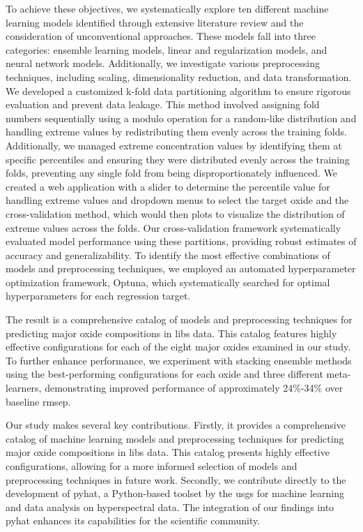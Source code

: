 To achieve these objectives, we systematically explore ten different machine learning models identified through extensive literature review and the consideration of unconventional approaches.
These models fall into three categories: ensemble learning models, linear and regularization models, and neural network models.
Additionally, we investigate various preprocessing techniques, including scaling, dimensionality reduction, and data transformation.
We developed a customized k-fold data partitioning algorithm to ensure rigorous evaluation and prevent data leakage.
This method involved assigning fold numbers sequentially using a modulo operation for a random-like distribution and handling extreme values by redistributing them evenly across the training folds.
Additionally, we managed extreme concentration values by identifying them at specific percentiles and ensuring they were distributed evenly across the training folds, preventing any single fold from being disproportionately influenced.
We created a web application with a slider to determine the percentile value for handling extreme values and dropdown menus to select the target oxide and the cross-validation method, which would then plots to visualize the distribution of extreme values across the folds.
Our cross-validation framework systematically evaluated model performance using these partitions, providing robust estimates of accuracy and generalizability.
To identify the most effective combinations of models and preprocessing techniques, we employed an automated hyperparameter optimization framework, Optuna, which systematically searched for optimal hyperparameters for each regression target.

\vspace{0.5em}

The result is a comprehensive catalog of models and preprocessing techniques for predicting major oxide compositions in \gls{libs} data.
This catalog features highly effective configurations for each of the eight major oxides examined in our study.
To further enhance performance, we experiment with stacking ensemble methods using the best-performing configurations for each oxide and three different meta-learners, demonstrating improved performance of approximately 24\%-34\% over baseline \gls{rmsep}.

\vspace{0.5em}

Our study makes several key contributions.
Firstly, it provides a comprehensive catalog of machine learning models and preprocessing techniques for predicting major oxide compositions in \gls{libs} data.
This catalog presents highly effective configurations, allowing for a more informed selection of models and preprocessing techniques in future work.
Secondly, we contribute directly to the development of \gls{pyhat}, a Python-based toolset by the \gls{usgs} for machine learning and data analysis on hyperspectral data.
The integration of our findings into \gls{pyhat} enhances its capabilities for the scientific community.

